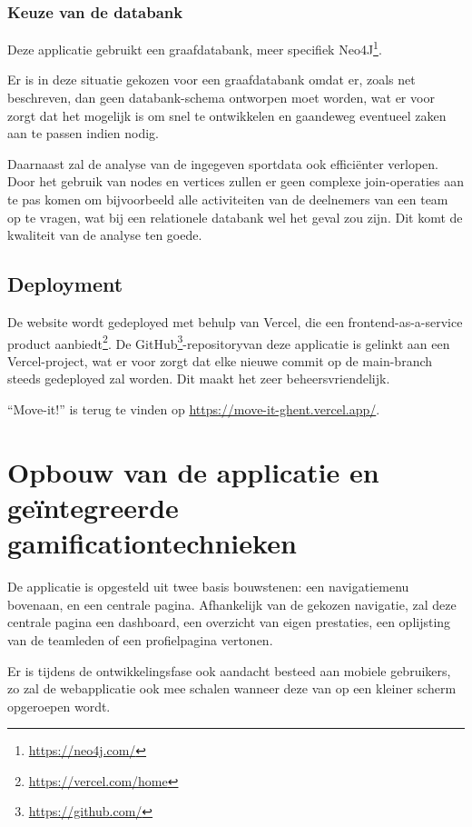 \subsubsection{Keuze van de databank}

Deze applicatie gebruikt een graafdatabank, meer specifiek Neo4J\footnote{\href{https://neo4j.com/}{https://neo4j.com/}}.

Er is in deze situatie gekozen voor een graafdatabank omdat er, zoals net beschreven, dan geen databank-schema ontworpen moet worden, wat er voor zorgt dat het mogelijk is om snel te ontwikkelen en gaandeweg eventueel zaken aan te passen indien nodig.

Daarnaast zal de analyse van de ingegeven sportdata ook efficiënter verlopen. Door het gebruik van nodes en vertices zullen er geen complexe join-operaties aan te pas komen om bijvoorbeeld alle activiteiten van de deelnemers van een team op te vragen, wat bij een relationele databank wel het geval zou zijn. Dit komt de kwaliteit van de analyse ten goede.

\subsection{Deployment}

De website wordt gedeployed met behulp van Vercel, die een frontend-as-a-service product aanbiedt\footnote{\href{https://vercel.com/home}{https://vercel.com/home}}. De GitHub\footnote{\href{https://github.com/}{https://github.com/}}-repositoryvan deze applicatie is gelinkt aan een Vercel-project, wat er voor zorgt dat elke nieuwe commit op de main-branch steeds gedeployed zal worden. Dit maakt het zeer beheersvriendelijk.

``Move-it!'' is terug te vinden op \href{https://move-it-ghent.vercel.app/}{https://move-it-ghent.vercel.app/}.

\section{Opbouw van de applicatie en geïntegreerde gamificationtechnieken}

De applicatie is opgesteld uit twee basis bouwstenen: een navigatiemenu bovenaan, en een centrale pagina. Afhankelijk van de gekozen navigatie, zal deze centrale pagina een dashboard, een overzicht van eigen prestaties, een oplijsting van de teamleden of een profielpagina vertonen.

Er is tijdens de ontwikkelingsfase ook aandacht besteed aan mobiele gebruikers, zo zal de webapplicatie ook mee schalen wanneer deze van op een kleiner scherm opgeroepen wordt.

